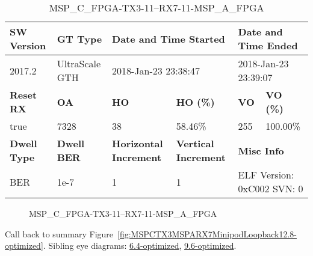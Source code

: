 \begin{table}[h]
\centering
\caption{MSP\_C\_FPGA-TX3-11--RX7-11-MSP\_A\_FPGA}
\label{tab:MSPCFPGATX311RX711MSPAFPGA12.8-optimized}
\begin{tabular}{@{}|l|l|l|l|l|l|@{}}
\toprule
\textbf{SW Version}                & \textbf{GT Type}   & \multicolumn{2}{l|}{\textbf{Date and Time Started}}            & \multicolumn{2}{l|}{\textbf{Date and Time Ended}}        \\ \midrule
2017.2                       & UltraScale GTH          & \multicolumn{2}{l|}{2018-Jan-23 23:38:47}                   & \multicolumn{2}{l|}{2018-Jan-23 23:39:07}               \\ \midrule
\textbf{Reset RX}                  & \textbf{OA} & \textbf{HO}   & \textbf{HO (\%)} & \textbf{VO} & \textbf{VO (\%)} \\ \midrule
true & 7328        & 38          & 58.46\%        & 255        & 100.00\%       \\ \midrule
\textbf{Dwell Type}                & \textbf{Dwell BER} & \textbf{Horizontal Increment} & \textbf{Vertical Increment}    & \multicolumn{2}{l|}{\textbf{Misc Info}}                  \\ \midrule
BER                            & 1e-7        & 1        & 1           & \multicolumn{2}{l|}{ELF Version: 0xC002 SVN: 0}                         \\ \bottomrule
\end{tabular}
\end{table}

\begin{figure}[h]
\caption{MSP\_C\_FPGA-TX3-11--RX7-11-MSP\_A\_FPGA} \label{fig:MSPCFPGATX311RX711MSPAFPGA12.8-optimized}
\end{figure}

Call back to summary Figure~\ref{fig:MSPCTX3MSPARX7MinipodLoopback12.8-optimized}.
Sibling eye diagrams: \hyperref[sec:MSPCFPGATX311RX711MSPAFPGA6.4-optimized]{6.4-optimized}, \hyperref[sec:MSPCFPGATX311RX711MSPAFPGA9.6-optimized]{9.6-optimized}.

\clearpage
\newpage

